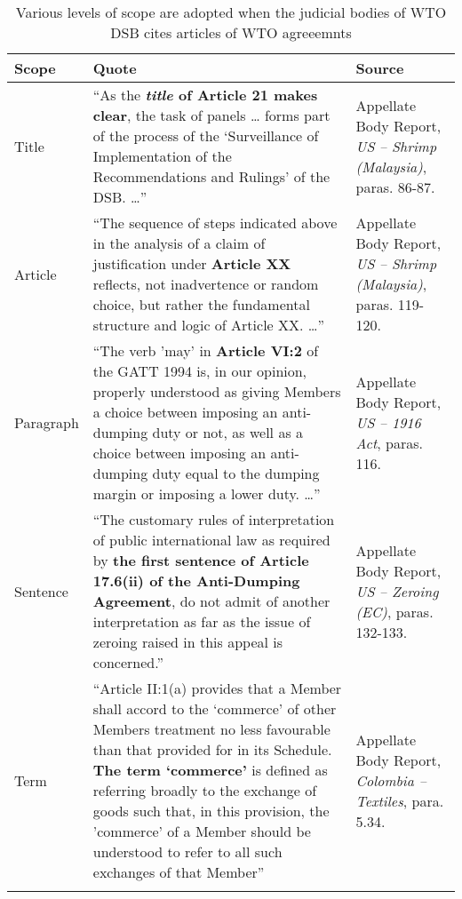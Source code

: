 \begin{xltabular}{\linewidth}{lXX}
    \hline
    \textbf{\normalsize Scope} 
    & \textbf{\normalsize Quote}
    & \textbf{\normalsize Source}
    \\
    \endfirsthead
    \hline \hline
    Title
    & ``As the \textbf{\textit{title}
    of Article 21 makes clear}, 
    the task of panels \ldots
    forms part of the process
    of the `Surveillance of 
    Implementation of the 
    Recommendations and Rulings' of the
    DSB. \ldots'' 
    & Appellate Body Report, \textit{US – Shrimp (Malaysia)}, paras. 86-87.
    \\
    \hline
    Article 
    &  ``The sequence of steps indicated above in the analysis of a claim of justification under \textbf{Article XX} reflects, not inadvertence or random choice, but rather the fundamental structure and logic of Article XX. \ldots''
    & Appellate Body Report, \textit{US – Shrimp (Malaysia)}, paras. 119-120.
    \\
    \hline
    Paragraph
    &  ``The verb 'may' in \textbf{Article VI:2} of the GATT 1994 is, in our opinion, properly
    understood as giving Members a choice between imposing an anti-dumping duty or
    not, as well as a choice between imposing an anti-dumping duty equal to the dumping
    margin or imposing a lower duty. \ldots''
    & Appellate Body Report, \textit{US – 1916 Act}, paras. 116.     
    \\
    \hline
    Sentence 
    & ``The customary rules of interpretation of public international law as
    required by \textbf{the first sentence of Article 17.6(ii) of the Anti-Dumping Agreement}, do
    not admit of another interpretation as far as the issue of zeroing raised in this appeal
    is concerned.''
    & Appellate Body Report, \textit{US – Zeroing (EC)}, paras. 132-133.
    \\
    \hline
    Term
    & ``Article II:1(a) provides that a
    Member shall accord to the `commerce' of other Members treatment no less
    favourable than that provided for in its Schedule. \textbf{The term `commerce'} is defined as
    referring broadly to the exchange of goods such that, in this provision, the 'commerce'
    of a Member should be understood to refer to all such exchanges of that Member''
    & Appellate Body Report, \textit{Colombia – Textiles}, para. 5.34.
    \\
    \hline
    \caption{ Various levels of scope are adopted when the judicial bodies of WTO DSB cites articles of WTO agreeemnts}
    \label{xltabular:level-of-scopes}

\end{xltabular}


